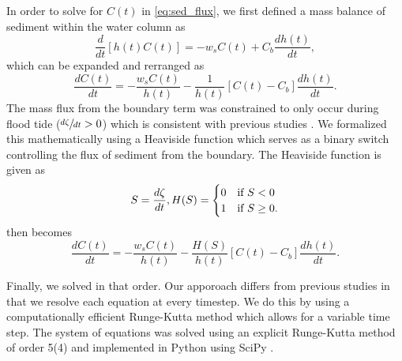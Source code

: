 In order to solve for $C(t)$ in \cref{eq:sed_flux}, we first defined a mass balance of sediment within the water column as
\begin{equation}\label{eq:conc_mass_bal}
	\frac{d}{dt}[h(t)C(t)] = -w_s C(t) + C_b \frac{dh(t)}{dt},
\end{equation}
which can be expanded and rerranged as
\begin{equation}\label{eq:conc_dt}
	\frac{dC(t)}{dt} = - \frac{w_sC(t)}{h(t)} - \frac{1}{h(t)}[C(t) - C_b]\frac{dh(t)}{dt}.
\end{equation}
The mass flux from the boundary term was constrained to only occur during flood tide ($\sfrac{d\zeta}{dt} > 0$) which is consistent with previous studies \citep{kroneMethodSimulatingMarsh1987, allenSaltmarshGrowthStratification1990, frenchNumericalSimulationVertical1993, temmermanModellingLongtermTidal2003, temmermanModellingEstuarineVariations2004}. We formalized this mathematically using a Heaviside function which serves as a binary switch controlling the flux of sediment from the boundary. The Heaviside function is given as
\begin{equation}\label{eq:heaviside}
	S = \frac{d\zeta}{dt},\\
	H(S) =
	\begin{cases}
		0 & \text{if $S < 0$}\\
		1 & \text{if $S \geq 0$}.
	\end{cases}
\end{equation}
 then becomes
\begin{equation}\label{eq:conc_sol}
	\frac{dC(t)}{dt} = - \frac{w_s C(t)}{h(t)} - \frac{H(S)}{h(t)} [C(t) - C_b]\frac{dh(t)}{dt}.
\end{equation}

Finally, we solved  in that order. Our apporoach differs from previous studies in that we resolve each equation at every timestep. We do this by using a computationally efficient Runge-Kutta method which allows for a variable time step. The system of equations was solved using an explicit Runge-Kutta method of order 5(4) \citep{dormandFamilyEmbeddedRungeKutta1980} and implemented in Python using SciPy \citep{virtanenSciPyFundamentalAlgorithms2020}.



